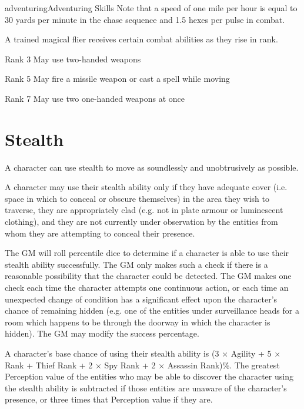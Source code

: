 \begin{Skill}[1.2]{adventuring}{Adventuring Skills}
Note that a speed of one mile per hour is equal to 30 yards per minute
in the chase sequence and 1.5 hexes per pulse in combat.

A trained magical flier receives certain combat abilities as they rise
in rank.

\begin{Description}

\item[Rank 3] May use two-handed weapons 

\item [Rank 5] May fire a missile weapon or cast a spell while moving

\item[Rank 7] May use two one-handed weapons at once

\end{Description}

\section{Stealth}
\label{adventuring:stealth}\label{stealth}
A character can use stealth to move as soundlessly and unobtrusively
as possible.

A character may use their stealth ability only if they have adequate
cover (i.e. space in which to conceal or obscure themselves) in the
area they wish to traverse, they are appropriately clad (e.g.  not in
plate armour or luminescent clothing), and they are not currently
under observation by the entities from whom they are attempting to
conceal their presence.

The GM will roll percentile dice to determine if a character is able
to use their stealth ability successfully.  The GM only makes such a
check if there is a reasonable possibility that the character could be
detected.  The GM makes one check each time the character attempts one
continuous action, or each time an unexpected change of condition has
a significant effect upon the character’s chance of remaining hidden
(e.g.  one of the entities under surveillance heads for a room which
happens to be through the doorway in which the character is
hidden). The GM may modify the success percentage.

A character’s base chance of using their stealth ability is (3 ×
Agility + 5 × Rank + Thief Rank + 2 × Spy Rank + 2 × Assassin Rank)\%.
The greatest Perception value of the entities who may be able to
discover the character using the stealth ability is subtracted if
those entities are unaware of the character’s presence, or three
times that Perception value if they are.


\end{Skill}
